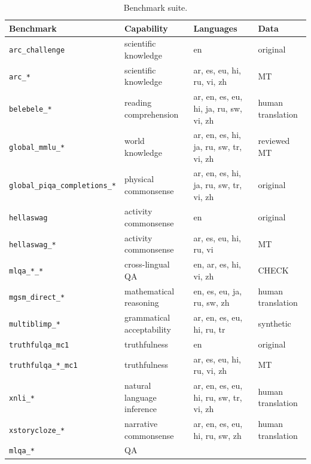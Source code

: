 \documentclass{article}
\begin{document}
\begin{table}[ht]
\centering
\small
\setlength{\tabcolsep}{5pt}
\caption{Benchmark suite.}
\label{tab:benchmarks}
\begin{tabular}{llll}
\toprule
Benchmark & Capability & Languages & Data \\
\midrule
\texttt{arc\_challenge}                       & scientific knowledge       & en                                            & original          \\
\texttt{arc\_*}                               & scientific knowledge       & ar, es, eu, hi, ru, vi, zh                    & MT                \\
\texttt{belebele\_*}                          & reading comprehension      & ar, en, es, eu, hi, ja, ru, sw, vi, zh        & human translation \\
\texttt{global\_mmlu\_*}                      & world knowledge            & ar, en, es, hi, ja, ru, sw, tr, vi, zh        & reviewed MT       \\
\texttt{global\_piqa\_completions\_*}         & physical commonsense       & ar, en, es, hi, ja, ru, sw, tr, vi, zh        & original          \\
\texttt{hellaswag}                            & activity commonsense       & en                                            & original          \\
\texttt{hellaswag\_*}                         & activity commonsense       & ar, es, eu, hi, ru, vi                        & MT                \\
\texttt{mlqa\_*\_*}                      & cross-lingual QA     & en, ar, es, hi, vi, zh                    & CHECK \\
\texttt{mgsm\_direct\_*}                      & mathematical reasoning     & en, es, eu, ja, ru, sw, zh                    & human translation \\
\texttt{multiblimp\_*}                        & grammatical acceptability  & ar, en, es, eu, hi, ru, tr                    & synthetic         \\
\texttt{truthfulqa\_mc1}                      & truthfulness               & en                                            & original          \\
\texttt{truthfulqa\_*\_mc1}                   & truthfulness               & ar, es, eu, hi, ru, vi, zh                    & MT                \\
\texttt{xnli\_*}                              & natural language inference & ar, en, es, eu, hi, ru, sw, tr, vi, zh        & human translation \\
\texttt{xstorycloze\_*}                       & narrative commonsense      & ar, en, es, eu, hi, ru, sw, zh                & human translation \\
\texttt{mlqa\_*}                       & QA      &   &   \\
\bottomrule
\end{tabular}
\end{table}
\end{document}
